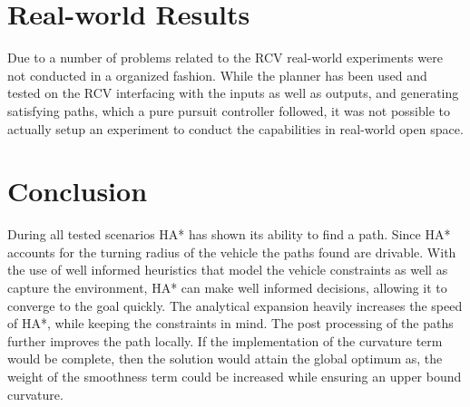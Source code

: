 %

\section{Real-world Results}
Due to a number of problems related to the RCV real-world experiments were not conducted in a organized fashion. While the planner has been used and tested on the RCV interfacing with the inputs as well as outputs, and generating satisfying paths, which a pure pursuit controller followed, it was not possible to actually setup an experiment to conduct the capabilities in real-world open space.

\section{Conclusion}
During all tested scenarios HA* has shown its ability to find a path. Since HA* accounts for the turning radius of the vehicle the paths found are drivable. With the use of well informed heuristics that model the vehicle constraints as well as capture the environment, HA* can make well informed decisions, allowing it to converge to the goal quickly. The analytical expansion heavily increases the speed of HA*, while keeping the constraints in mind. The post processing of the paths further improves the path locally. If the implementation of the curvature term would be complete, then the solution would attain the global optimum as, the weight of the smoothness term could be increased while ensuring an upper bound curvature.